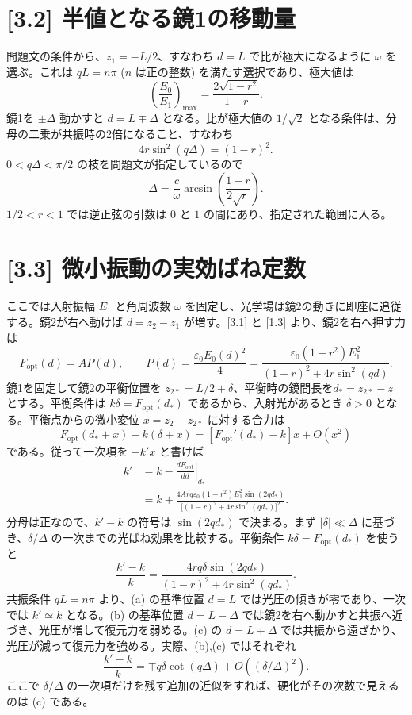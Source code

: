 \documentclass[11pt,a4paper]{article}
\begin{document}
\section*{[3.2] 半値となる鏡1の移動量}
問題文の条件から、$z_1=-L/2$、すなわち $d=L$ で比が極大になるように $\omega$ を選ぶ。これは $qL=n\pi$ ($n$ は正の整数) を満たす選択であり、極大値は
\[
 \left(\frac{E_0}{E_1}\right)_{\!\max}
 =\frac{2\sqrt{1-r^2}}{1-r}.
\]
鏡1を $\pm\Delta$ 動かすと $d=L\mp\Delta$ となる。比が極大値の $1/\sqrt2$ となる条件は、分母の二乗が共振時の2倍になること、すなわち
\[
 4r\sin^2(q\Delta)=(1-r)^2.
\]
$0<q\Delta<\pi/2$ の枝を問題文が指定しているので
\[
 \boxed{\Delta=\frac{c}{\omega}
 \arcsin\!\left(\frac{1-r}{2\sqrt r}\right)}.
\]
$1/2<r<1$ では逆正弦の引数は $0$ と $1$ の間にあり、指定された範囲に入る。

\section*{[3.3] 微小振動の実効ばね定数}
ここでは入射振幅 $E_1$ と角周波数 $\omega$ を固定し、光学場は鏡2の動きに即座に追従する。鏡2が右へ動けば $d=z_2-z_1$ が増す。[3.1] と [1.3] より、鏡2を右へ押す力は
\[
 F_{\mathrm{opt}}(d)=AP(d),\qquad
 P(d)=\frac{\varepsilon_0E_0(d)^2}{4}
 =\frac{\varepsilon_0(1-r^2)E_1^2}
 {(1-r)^2+4r\sin^2(qd)}.
\]
鏡1を固定して鏡2の平衡位置を $z_{2*}=L/2+\delta$、平衡時の鏡間長を$d_*=z_{2*}-z_1$とする。平衡条件は $k\delta=F_{\mathrm{opt}}(d_*)$ であるから、入射光があるとき $\delta>0$ となる。平衡点からの微小変位 $x=z_2-z_{2*}$ に対する合力は
\begin{equation}
 F_{\mathrm{opt}}(d_*+x)-k(\delta+x)
 =[F_{\mathrm{opt}}'(d_*)-k]x+O(x^2)
\end{equation}
である。従って一次項を $-k'x$ と書けば
\begin{align*}
 k'&=k-\left.\frac{dF_{\mathrm{opt}}}{dd}\right|_{d_*}\\
 &=k+\frac{4Arq\varepsilon_0(1-r^2)E_1^2\sin(2qd_*)}
 {\bigl[(1-r)^2+4r\sin^2(qd_*)\bigr]^2}.
\end{align*}
分母は正なので、$k'-k$ の符号は $\sin(2qd_*)$ で決まる。まず $|\delta|\ll\Delta$ に基づき、$\delta/\Delta$ の一次までの光ばね効果を比較する。平衡条件 $k\delta=F_{\mathrm{opt}}(d_*)$ を使うと
\[
 \frac{k'-k}{k}
 =\frac{4rq\delta\sin(2qd_*)}
 {(1-r)^2+4r\sin^2(qd_*)}.
\]
共振条件 $qL=n\pi$ より、(a) の基準位置 $d=L$ では光圧の傾きが零であり、一次では $k'\simeq k$ となる。(b) の基準位置 $d=L-\Delta$ では鏡2を右へ動かすと共振へ近づき、光圧が増して復元力を弱める。(c) の $d=L+\Delta$ では共振から遠ざかり、光圧が減って復元力を強める。実際、(b),(c) ではそれぞれ
\[
 \frac{k'-k}{k}=\mp q\delta\cot(q\Delta)
 +O\!\left((\delta/\Delta)^2\right).
\]
ここで $\delta/\Delta$ の一次項だけを残す追加の近似をすれば、硬化がその次数で見えるのは (c) である。
\end{document}
